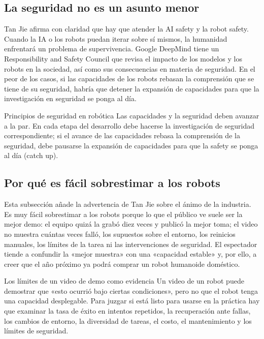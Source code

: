 \subsection{La seguridad no es un asunto menor}

Tan Jie afirma con claridad que hay que atender la AI safety y la robot safety. Cuando la IA o los robots puedan iterar sobre sí mismos, la humanidad enfrentará un problema de supervivencia. Google DeepMind tiene un Responsibility and Safety Council que revisa el impacto de los modelos y los robots en la sociedad, así como sus consecuencias en materia de seguridad. En el peor de los casos, si las capacidades de los robots rebasan la comprensión que se tiene de su seguridad, habría que detener la expansión de capacidades para que la investigación en seguridad se ponga al día.

\begin{importantbox}{Principios de seguridad en robótica}
Las capacidades y la seguridad deben avanzar a la par. En cada etapa del desarrollo debe hacerse la investigación de seguridad correspondiente; si el avance de las capacidades rebasa la comprensión de la seguridad, debe pausarse la expansión de capacidades para que la safety se ponga al día (catch up).
\end{importantbox}

\subsection{Por qué es fácil sobrestimar a los robots}

Esta subsección añade la advertencia de Tan Jie sobre el ánimo de la industria. Es muy fácil sobrestimar a los robots porque lo que el público ve suele ser la mejor demo: el equipo quizá la grabó diez veces y publicó la mejor toma; el video no muestra cuántas veces falló, los supuestos sobre el entorno, los reinicios manuales, los límites de la tarea ni las intervenciones de seguridad. El espectador tiende a confundir la «mejor muestra» con una «capacidad estable» y, por ello, a creer que el año próximo ya podrá comprar un robot humanoide doméstico.

\begin{warningbox}{Los límites de un video de demo como evidencia}
Un video de un robot puede demostrar que «esto ocurrió bajo ciertas condiciones», pero no que el robot tenga una capacidad desplegable. Para juzgar si está listo para usarse en la práctica hay que examinar la tasa de éxito en intentos repetidos, la recuperación ante fallas, los cambios de entorno, la diversidad de tareas, el costo, el mantenimiento y los límites de seguridad.
\end{warningbox}

